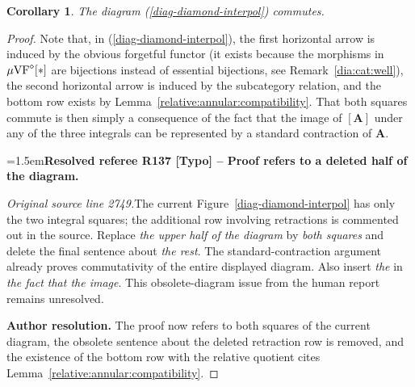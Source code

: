 \documentclass[12pt]{amsart}
\newcommand{\ResolvedRefereeRemark}[5]{%
  \par\medskip\begingroup\normalfont\small\color{gray}%
  \emergencystretch=1.5em\noindent\textbf{Resolved referee R#1 [#2] -- #3.}\par\nobreak\noindent #4\par
  \medskip\color{ResolutionGreen}\noindent\textbf{Author resolution.} #5\par
  \endgroup\medskip
}
\theoremstyle{plain}
\newtheorem{cor}[thm]{Corollary}
\theoremstyle{definition}
\theoremstyle{remark}
\numberwithin{equation}{section}
\theoremstyle{plain}
\newcommand{\VF}{\textup{VF}}
\newcommand{\0}{\emptyset}
\newcommand{\mgVF}{{\mu} {\VF}}
\begin{document}
\begin{cor}\label{db:to:novol}
The diagram (\ref{diag-diamond-interpol}) commutes.
\end{cor}
\begin{proof}
Note that, in (\ref{diag-diamond-interpol}),  the first horizontal arrow  is induced by the obvious forgetful functor (it exists
because the morphisms in $\mgVF^\diamond[*]$ are bijections instead of essential bijections, see Remark~\ref{dia:cat:well}), the second horizontal arrow is induced by the subcategory relation, and the bottom row exists by Lemma~\ref{relative:annular:compatibility}. That both squares commute is then simply a consequence of the fact that the image of $[\bm A]$ under any of the three integrals can be represented by a standard contraction of $\bm A$.

\ResolvedRefereeRemark{137}{Typo}{Proof refers to a deleted half of the diagram}{%
\textit{Original source line 2749.}\quad The current Figure~\ref{diag-diamond-interpol} has only the two integral squares; the additional row involving retractions is commented out in the source. Replace \emph{the upper half of the diagram} by \emph{both squares} and delete the final sentence about \emph{the rest}. The standard-contraction argument already proves commutativity of the entire displayed diagram. Also insert \emph{the} in \emph{the fact that the image}. This obsolete-diagram issue from the human report remains unresolved.
}{The proof now refers to both squares of the current diagram, the obsolete sentence about the deleted retraction row is removed, and the existence of the bottom row with the relative quotient cites Lemma~\ref{relative:annular:compatibility}.}
\end{proof}
\end{document}
